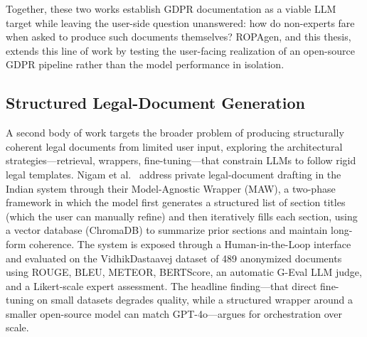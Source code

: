 Together, these two works establish GDPR documentation as a viable LLM target while leaving the user-side question unanswered: how do non-experts fare when asked to produce such documents themselves? ROPAgen, and this thesis, extends this line of work by testing the user-facing realization of an open-source GDPR pipeline rather than the model performance in isolation.

\subsection{Structured Legal-Document Generation}

A second body of work targets the broader problem of producing structurally coherent legal documents from limited user input, exploring the architectural strategies---retrieval, wrappers, fine-tuning---that constrain LLMs to follow rigid legal templates. Nigam et al.\ \cite{nigamStructuredLegalDocument2025} address private legal-document drafting in the Indian system through their Model-Agnostic Wrapper (MAW), a two-phase framework in which the model first generates a structured list of section titles (which the user can manually refine) and then iteratively fills each section, using a vector database (ChromaDB) to summarize prior sections and maintain long-form coherence. The system is exposed through a Human-in-the-Loop interface and evaluated on the VidhikDastaavej dataset of 489 anonymized documents using ROUGE, BLEU, METEOR, BERTScore, an automatic G-Eval LLM judge, and a Likert-scale expert assessment. The headline finding---that direct fine-tuning on small datasets degrades quality, while a structured wrapper around a smaller open-source model can match GPT-4o---argues for orchestration over scale.


